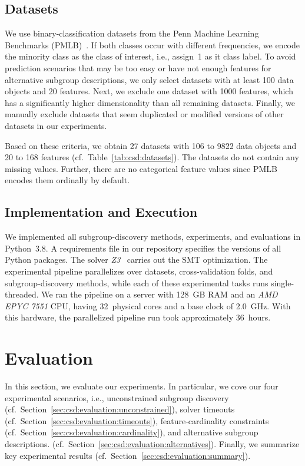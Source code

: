 \documentclass{article}
\theoremstyle{definition}
\begin{document}
\subsection{Datasets}
\label{sec:csd:experimental-design:datasets}

We use binary-classification datasets from the Penn Machine Learning Benchmarks (PMLB)~\cite{olson2017pmlb, romano2021pmlb}.
If both classes occur with different frequencies, we encode the minority class as the class of interest, i.e., assign~1 as it class label.
To avoid prediction scenarios that may be too easy or have not enough features for alternative subgroup descriptions, we only select datasets with at least 100 data objects and 20 features.
Next, we exclude one dataset with 1000 features, which has a significantly higher dimensionality than all remaining datasets.
Finally, we manually exclude datasets that seem duplicated or modified versions of other datasets in our experiments.

Based on these criteria, we obtain 27 datasets with 106 to 9822 data objects and 20 to 168 features (cf.~Table~\ref{tab:csd:datasets}).
The datasets do not contain any missing values.
Further, there are no categorical feature values since PMLB encodes them ordinally by default.

\subsection{Implementation and Execution}
\label{sec:csd:experimental-design:implementation}

We implemented all subgroup-discovery methods, experiments, and evaluations in Python~3.8.
A requirements file in our repository specifies the versions of all Python packages.
The solver \emph{Z3}~\cite{bjorner2015nuz, deMoura2008z3} carries out the SMT optimization.
The experimental pipeline parallelizes over datasets, cross-validation folds, and subgroup-discovery methods, while each of these experimental tasks runs single-threaded.
We ran the pipeline on a server with 128~GB RAM and an \emph{AMD EPYC 7551} CPU, having 32~physical cores and a base clock of 2.0~GHz.
With this hardware, the parallelized pipeline run took approximately 36~hours.

\section{Evaluation}
\label{sec:csd:evaluation}

In this section, we evaluate our experiments.
In particular, we cove our four experimental scenarios, i.e., unconstrained subgroup discovery (cf.~Section~\ref{sec:csd:evaluation:unconstrained}), solver timeouts (cf.~Section~\ref{sec:csd:evaluation:timeouts}), feature-cardinality constraints (cf.~Section~\ref{sec:csd:evaluation:cardinality}), and alternative subgroup descriptions. (cf.~Section~\ref{sec:csd:evaluation:alternatives}).
Finally, we summarize key experimental results (cf.~Section~\ref{sec:csd:evaluation:summary}).
\end{document}
